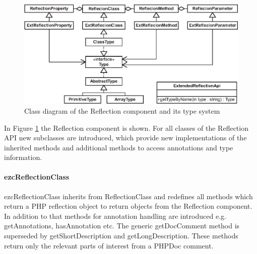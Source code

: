 \documentclass[10pt,final,a4paper,oneside]{article}
\begin{document}
\begin{figure}[htbp]
	\centering
		\includegraphics[width=1.00\textwidth]{figures/ezcReflection.eps}
	\caption{Class diagram of the Reflection component and its type system}
	\label{fig:ezcReflection}
\end{figure}


In Figure \ref{fig:ezcReflection} the Reflection component is shown.
For all classes of the Reflection API
new subclasses are introduced,
which provide new implementations
of the inherited methods and
additional methods to access
annotations and type information.

\paragraph{ezcReflectionClass}
ezcReflectionClass inherits from ReflectionClass
and redefines all methods which return a PHP reflection object
to return objects from the Reflection component.
In addition to that
methods for annotation handling
are introduced e.g. 
getAnnotations,
hasAnnotation etc.
The generic getDocComment method is superseded
by getShortDescription and getLongDescription.
These methods return only the relevant parts
of interest from a PHPDoc comment.

\end{document}

